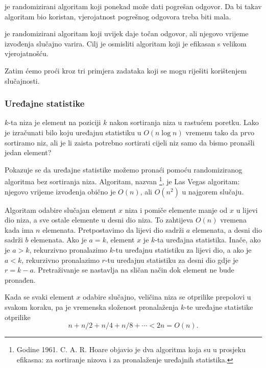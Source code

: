 
 je randomizirani algoritam
koji ponekad može dati pogrešan odgovor.
Da bi takav algoritam bio koristan,
vjerojatnost pogrešnog odgovora treba biti mala.


 je randomizirani algoritam
koji uvijek daje točan odgovor,
ali njegovo vrijeme izvođenja slučajno varira.
Cilj je osmisliti algoritam koji je
efikasan s velikom vjerojatnošću.

Zatim ćemo proći kroz tri primjera zadataka koji
se mogu riješiti korištenjem slučajnosti.

\subsubsection{Uređajne statistike}


$k$-ta  niza
je element na poziciji $k$ nakon sortiranja
niza u rastućem poretku.
Lako je izračunati bilo koju uređajnu statistiku
u $O(n \log n)$ vremenu tako da prvo sortiramo niz,
ali je li zaista potrebno sortirati cijeli niz
samo da bismo pronašli jedan element?

Pokazuje se da uređajne statistike možemo pronaći
pomoću randomiziranog algoritma bez sortiranja niza.
Algoritam, nazvan \footnote{Godine 1961.
C. A. R. Hoare objavio je dva algoritma koja
su u prosjeku efikasna:  
 \cite{hoa61a} za sortiranje nizova i
 \cite{hoa61b} za pronalaženje uređajnih statistika.}, je Las Vegas algoritam:
njegovo vrijeme izvođenja obično je $O(n)$,
ali $O(n^2)$ u najgorem slučaju.

Algoritam odabire slučajan element $x$
niza i pomiče elemente manje od $x$
u lijevi dio niza,
a sve ostale elemente u desni dio niza.
To zahtijeva $O(n)$ vremena kada ima $n$ elemenata.
Pretpostavimo da lijevi dio sadrži $a$ elemenata,
a desni dio sadrži $b$ elemenata.
Ako je $a=k$, element $x$ je $k$-ta uređajna statistika.
Inače, ako je $a>k$, rekurzivno pronalazimo $k$-tu uređajnu
statistiku za lijevi dio,
a ako je $a<k$, rekurzivno pronalazimo $r$-tu uređajnu
statistiku za desni dio gdje je $r=k-a$.
Pretraživanje se nastavlja na sličan način dok element
ne bude pronađen.

Kada se svaki element $x$ odabire slučajno,
veličina niza se otprilike prepolovi u svakom koraku,
pa je vremenska složenost
pronalaženja $k$-te uređajne statistike otprilike
\[n+n/2+n/4+n/8+\cdots < 2n = O(n).\]

